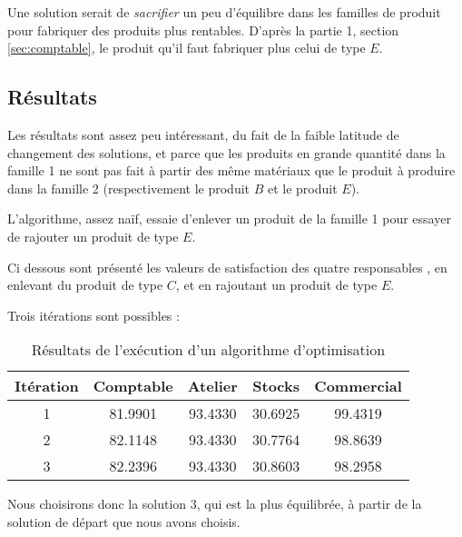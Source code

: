 Une solution serait de \emph{sacrifier} un peu d'équilibre dans les familles de
produit pour fabriquer des produits plus rentables. D'après la partie 1, section 
\ref{sec:comptable}, le produit qu'il faut fabriquer plus celui de type $E$.

\subsection{Résultats}
Les résultats sont assez peu intéressant, du fait de la faible latitude de
changement des solutions, et parce que les produits en grande quantité dans la
famille 1 ne sont pas fait à partir des même matériaux que le produit à produire
dans la famille 2 (respectivement le produit $B$ et le produit $E$).

L'algorithme, assez naïf, essaie d'enlever un produit de la famille 1 pour
essayer de rajouter un produit de type $E$.

Ci dessous sont présenté les valeurs de satisfaction des quatre responsables ,
   en enlevant du produit de type $C$, et en rajoutant un produit de type $E$.

   Trois itérations sont possibles :
   \begin{table}[ht!]
   \begin{center}
\begin{tabular}{|c|c|c|c|c|}
\hline
    Itération & Comptable & Atelier & Stocks & Commercial \\
	\hline
1 &   81.9901 & 93.4330 & 30.6925 & 99.4319 \\
       \hline
2&   82.1148 & 93.4330 & 30.7764 & 98.8639 \\
       \hline
  3&  82.2396 & 93.4330 & 30.8603 & 98.2958 \\
       \hline

\end{tabular}
\end{center}
\caption{Résultats de l'exécution d'un algorithme d'optimisation}
\end{table}

Nous choisirons donc la solution 3, qui est la plus équilibrée, à partir de la
solution de départ que nous avons choisis.
